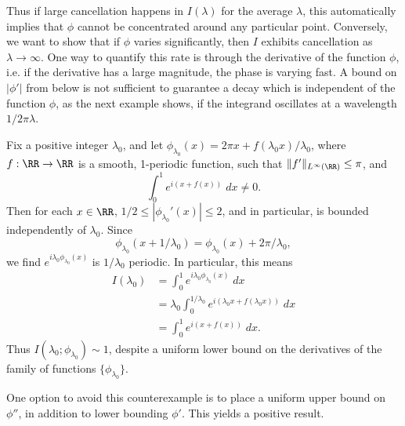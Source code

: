 Thus if large cancellation happens in $I(\lambda)$ for the average $\lambda$, this automatically implies that $\phi$ cannot be concentrated around any particular point.  Conversely, we want to show that if $\phi$ varies significantly, then $I$ exhibits cancellation as $\lambda \to \infty$. One way to quantify this rate is through the derivative of the function $\phi$, i.e. if the derivative has a large magnitude, the phase is varying fast. A bound on $|\phi'|$ from below is not sufficient to guarantee a decay which is independent of the function $\phi$, as the next example shows, if the integrand oscillates at a wavelength $1/ 2 \pi \lambda$.

\begin{example}
  Fix a positive integer $\lambda_0$, and let $\phi_{\lambda_0}(x) = 2 \pi x + f(\lambda_0 x) / \lambda_0$, where $f: \RR \to \RR$ is a smooth, 1-periodic function, such that $\| f' \|_{L^\infty(\RR)} \leq \pi$, and
  \[ \int_0^1 e^{i (x + f(x))}\; dx \neq 0. \]
  Then for each $x \in \RR$, $1/2 \leq |\phi_{\lambda_0}'(x)| \leq 2$, and in particular, is bounded independently of $\lambda_0$. Since
  \[ \phi_{\lambda_0}(x + 1/\lambda_0) = \phi_{\lambda_0}(x) + 2 \pi / \lambda_0, \]
  we find $e^{i \lambda_0 \phi_{\lambda_0}(x)}$ is $1/\lambda_0$ periodic. In particular, this means
  \begin{align*}
    I(\lambda_0) &= \int_0^1 e^{i \lambda_0 \phi_{\lambda_0}(x)}\; dx\\
    &= \lambda_0 \int_0^{1/\lambda_0} e^{i (\lambda_0 x + f(\lambda_0 x))}\; dx\\
    &= \int_0^1 e^{i (x + f(x))}\; dx.
  \end{align*}
  Thus $I(\lambda_0;\phi_{\lambda_0}) \sim 1$, despite a uniform lower bound on the derivatives of the family of functions $\{ \phi_{\lambda_0} \}$.
\end{example}

One option to avoid this counterexample is to place a uniform upper bound on $\phi''$, in addition to lower bounding $\phi'$. This yields a positive result.

